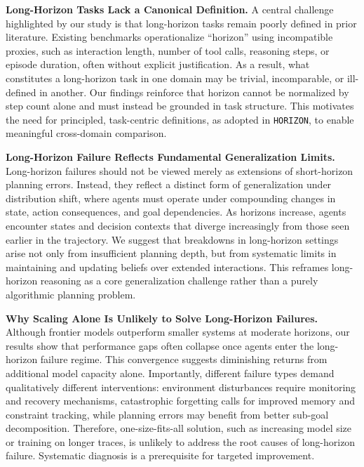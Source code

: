 \documentclass[11pt]{article}
\begin{document}

\textbf{Long-Horizon Tasks Lack a Canonical Definition.}
A central challenge highlighted by our study is that long-horizon tasks remain poorly defined in prior literature. Existing benchmarks operationalize ``horizon'' using incompatible proxies, such as interaction length, number of tool calls, reasoning steps, or episode duration, often without explicit justification. As a result, what constitutes a long-horizon task in one domain may be trivial, incomparable, or ill-defined in another. Our findings reinforce that horizon cannot be normalized by step count alone and must instead be grounded in task structure. This motivates the need for principled, task-centric definitions, as adopted in \texttt{HORIZON}, to enable meaningful cross-domain comparison.

\textbf{Long-Horizon Failure Reflects Fundamental Generalization Limits.}
Long-horizon failures should not be viewed merely as extensions of short-horizon planning errors. Instead, they reflect a distinct form of generalization under distribution shift, where agents must operate under compounding changes in state, action consequences, and goal dependencies. As horizons increase, agents encounter states and decision contexts that diverge increasingly from those seen earlier in the trajectory. We suggest that breakdowns in long-horizon settings arise not only from insufficient planning depth, but from systematic limits in maintaining and updating beliefs over extended interactions. This reframes long-horizon reasoning as a core generalization challenge rather than a purely algorithmic planning problem.

\textbf{Why Scaling Alone Is Unlikely to Solve Long-Horizon Failures.}
Although frontier models outperform smaller systems at moderate horizons, our results show that performance gaps often collapse once agents enter the long-horizon failure regime. This convergence suggests diminishing returns from additional model capacity alone. Importantly, different failure types demand qualitatively different interventions: environment disturbances require monitoring and recovery mechanisms, catastrophic forgetting calls for improved memory and constraint tracking, while planning errors may benefit from better sub-goal decomposition. Therefore, one-size-fits-all solution, such as increasing model size or training on longer traces, is unlikely to address the root causes of long-horizon failure. Systematic diagnosis is a prerequisite for targeted improvement.
\end{document}
